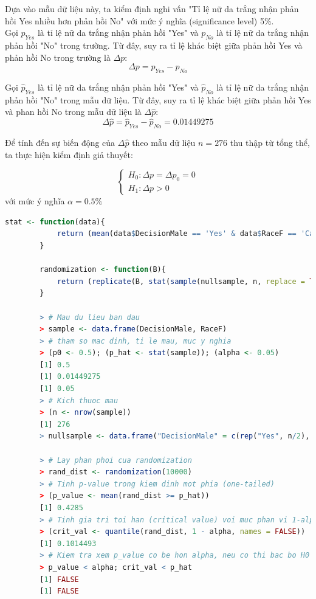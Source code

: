\documentclass[a4paper,12pt]{article}
\begin{document}
		Dựa vào mẫu dữ liệu này, ta kiểm định nghi vấn "Tỉ lệ nữ da trắng nhận phản hồi Yes nhiều hơn phản hồi No" với mức ý nghĩa (significance level) 5\%.\\
		
		Gọi $p_{Yes}$ là tỉ lệ nữ da trắng nhận phản hồi "Yes" và $p_{No}$ là tỉ lệ nữ da trắng nhận phản hồi "No" trong trường. Từ đây, suy ra tỉ lệ khác biệt giữa phản hồi Yes và phản hồi No trong trường là $\Delta p$: 
		$$\Delta p = p_{Yes} - p_{No}$$
		
		Gọi $\hat{p}_{Yes}$ là tỉ lệ nữ da trắng nhận phản hồi "Yes" và $\hat{p}_{No}$ là tỉ lệ nữ da trắng nhận phản hồi "No" trong mẫu dữ liệu. Từ đây, suy ra tỉ lệ khác biệt giữa phản hồi Yes và phan hồi No trong mẫu dữ liệu là $\Delta\hat{p}$:
		$$\Delta\hat{p} = \hat{p}_{Yes} - \hat{p}_{No} = 0.01449275$$
		
		Để tính đến sự biến động của $\Delta\hat{p}$ theo mẫu dữ liệu $n = 276$ thu thập từ tổng thể, ta thực hiện kiểm định giả thuyết:
		
		\begin{equation*}
		\begin{cases}
		H_0: \Delta p = \Delta p_0 = 0\\
		H_1: \Delta p > 0
		\end{cases}
		\end{equation*}
		với mức ý nghĩa $\alpha = 0.5\%$
		
		\begin{lstlisting}[language=R]
		stat <- function(data){
			return (mean(data$DecisionMale == 'Yes' & data$RaceF == 'Caucasian') - mean(data$DecisionMale == 'No' & data$RaceF == 'Caucasian')) # Ti le khac biet
		}
		
		randomization <- function(B){
			return (replicate(B, stat(sample(nullsample, n, replace = TRUE))))
		}
		
		> # Mau du lieu ban dau
		> sample <- data.frame(DecisionMale, RaceF)
		> # tham so mac dinh, ti le mau, muc y nghia
		> (p0 <- 0.5); (p_hat <- stat(sample)); (alpha <- 0.05)
		[1] 0.5
		[1] 0.01449275
		[1] 0.05
		> # Kich thuoc mau
		> (n <- nrow(sample))
		[1] 276
		> nullsample <- data.frame("DecisionMale" = c(rep("Yes", n/2), rep("No", n/2)), "RaceF" = rep("Caucasian", n)) # Mau du lieu tuong ung voi H0 
		
		> # Lay phan phoi cua randomization
		> rand_dist <- randomization(10000)
		> # Tinh p-value trong kiem dinh mot phia (one-tailed)
		> (p_value <- mean(rand_dist >= p_hat))
		[1] 0.4285
		> # Tinh gia tri toi han (critical value) voi muc phan vi 1-alpha
		> (crit_val <- quantile(rand_dist, 1 - alpha, names = FALSE))
		[1] 0.1014493
		> # Kiem tra xem p_value co be hon alpha, neu co thi bac bo H0
		> p_value < alpha; crit_val < p_hat
		[1] FALSE
		[1] FALSE
		\end{lstlisting}
	
\end{document}
